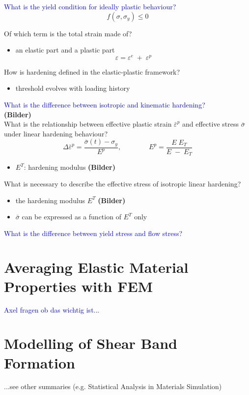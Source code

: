 \documentclass[english]{scrartcl}
\newcommand{\minus}{{\;} - {\;}}
\newcommand{\plus}{{\;} + {\;}}
\newenvironment{myitemize}{ \begin{itemize}
		\setlength{\itemsep}{0pt}
		\setlength{\parskip}{0pt}
		\setlength{\parsep}{0pt}     }
	{ \end{itemize}                  }
\begin{document}
\textcolor{blue}{What is the yield condition for ideally plastic behaviour?}
\begin{equation*}
	f(\sigma, \sigma_{y}) \le 0
\end{equation*}

Of which term is the total strain made of?
\begin{myitemize}
	\item an elastic part and a plastic part
	\begin{equation*}
		\varepsilon = \varepsilon^{e}  \plus \varepsilon^{p}
	\end{equation*}
\end{myitemize}

How is hardening defined in the elastic-plastic framework?
\begin{myitemize}
	\item threshold evolves with loading history
\end{myitemize}

\textcolor{blue}{What is the difference between isotropic and kinematic hardening?} \\
\textbf{(Bilder)} \\

What is the relationship between effective plastic strain $ \bar{\varepsilon}^{p} $ and effective stress $ \bar{\sigma} $ under linear hardening behaviour?
\begin{equation*}
\Delta \bar{\varepsilon}^{p} = \dfrac{\bar{\sigma}(t) - \sigma_{y}}{E^{p}}, \qquad \qquad E^{p} = \dfrac{E \; E_{T}}{E \minus E_{T}}
\end{equation*}
\begin{myitemize}
	\item $ E^{T} $: hardening modulus \textbf{(Bilder)}
\end{myitemize}

What is necessary to describe the effective stress of isotropic linear hardening?
\begin{myitemize}
	\item the hardening modulus $ E^{T} $ \textbf{(Bilder)}
	\item $ \bar{\sigma} $ can be expressed as a function of $ E^{T} $ only 
\end{myitemize}

\textcolor{blue}{What is the difference between yield stress and flow stress?}


\section*{Averaging Elastic Material Properties with FEM}

\textcolor{blue}{Axel fragen ob das wichtig ist...} \\

\section*{Modelling of Shear Band Formation}

...see other summaries (e.g. Statistical Analysis in Materials Simulation)
\end{document}
